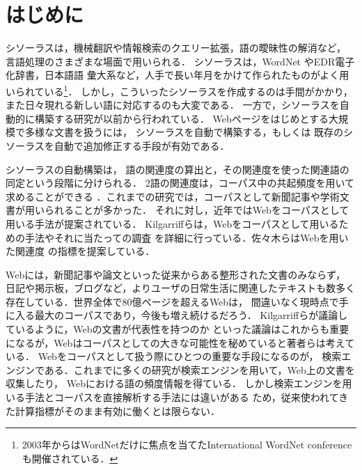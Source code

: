 \documentclass[japanese]{jnlp_1.3a}
\begin{document}
\maketitle




\section{はじめに}

シソーラスは，機械翻訳や情報検索のクエリー拡張，語の曖昧性の解消など，
言語処理のさまざまな場面で用いられる．
シソーラスは，WordNet \cite{Miller90}やEDR電子化辞書\cite{EDR}，日本語語
彙大系\cite{goitaikei}など，人手で長い年月をかけて作られたものがよく用いられている\footnote{2003年からはWordNetだけに焦点を当てたInternational WordNet conferenceも開催されている．}．
しかし，こういったシソーラスを作成するのは手間がかかり，また日々現れる新しい語に対応するのも大変である．
一方で，シソーラスを自動的に構築する研究が以前から行われている\cite{Crouch92,Grefenstette94}．
Webページをはじめとする大規模で多様な文書を扱うには，
シソーラスを自動で構築する，もしくは
既存のシソーラスを自動で追加修正する手段が有効である．


シソーラスの自動構築は，
語の関連度の算出と，その関連度を使った関連語の同定という段階に分けられる\cite{Curran02-2}．
2語の関連度は，コーパス中の共起頻度を用いて求めることができる
\cite{Church90}．これまでの研究では，コーパスとして新聞記事や学術文書が用いられることが多かった．
それに対し，近年ではWebをコーパスとして用いる手法が提案されている．
Kilgarriffらは，Webをコーパスとして用いるための手法やそれに当たっての調査
を詳細に行っている\cite{Kilgarriff03}．佐々木らはWebを用いた関連度
の指標を提案している\cite{Sasaki05}．



Webには，新聞記事や論文といった従来からある整形された文書のみならず，
日記や掲示板，ブログなど，よりユーザの日常生活に関連したテキストも数多く存在している．世界全体で80億ページを超えるWebは，
間違いなく現時点で手に入る最大のコーパスであり，今後も増え続けるだろう．
Kilgarriffらが議論しているように，Webの文書が代表性を持つのか
といった議論はこれからも重要になるが，Webはコーパスとしての大きな可能性を秘めていると著者らは考えている．
Webをコーパスとして扱う際にひとつの重要な手段になるのが，
検索エンジンである．これまでに多くの研究が検索エンジンを用いて，Web上の文書を収集したり，
Webにおける語の頻度情報を得ている\cite{Turney01,Heylighen01}．
しかし検索エンジンを用いる手法とコーパスを直接解析する手法には違いがある
ため，従来使われてきた計算指標がそのまま有効に働くとは限らない．
\end{document}
